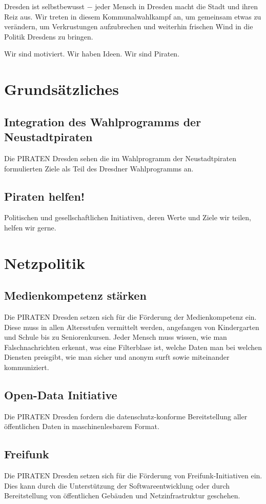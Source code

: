 \documentclass[a4paper, 11pt]{article}
\begin{document}
Dresden ist selbstbewusst $-$ jeder Mensch in Dresden macht die Stadt und ihren Reiz aus. Wir treten in diesem Kommunalwahlkampf an, um gemeinsam etwas zu verändern, um Verkrustungen aufzubrechen und weiterhin frischen Wind in die Politik Dresdens zu bringen.\newline

Wir sind motiviert. Wir haben Ideen. Wir sind Piraten.

\section{Grundsätzliches}
\subsection{Integration des Wahlprogramms der Neustadtpiraten}
Die PIRATEN Dresden sehen die im Wahlprogramm der Neustadtpiraten formulierten Ziele als Teil des Dresdner Wahlprogramms an.

\subsection{Piraten helfen!}
Politischen und gesellschaftlichen Initiativen, deren Werte und Ziele wir teilen, helfen wir gerne.

\section{Netzpolitik}

\subsection{Medienkompetenz stärken}
Die PIRATEN Dresden setzen sich für die Förderung der Medienkompetenz ein. Diese muss in allen Altersstufen vermittelt werden, angefangen von Kindergarten und Schule bis zu Seniorenkursen. Jeder Mensch muss wissen, wie man Falschnachrichten erkennt, was eine Filterblase ist, welche Daten man bei welchen Diensten preisgibt, wie man sicher und anonym surft sowie miteinander kommuniziert.


\subsection{Open-Data Initiative}
Die PIRATEN Dresden fordern die datenschutz-konforme Bereitstellung aller öffentlichen Daten in maschinenlesbarem Format.

\subsection{Freifunk}
Die PIRATEN Dresden setzen sich für die Förderung von Freifunk-Initiativen ein. Dies kann durch die Unterstützung der Softwareentwicklung oder durch Bereitstellung von öffentlichen Gebäuden und Netzinfrastruktur geschehen.
\end{document}
